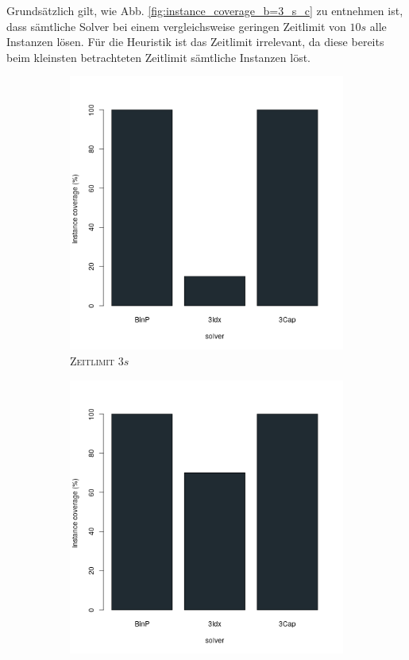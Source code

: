 Grundsätzlich gilt, wie Abb. \ref{fig:instance_coverage_b=3_s_c} zu entnehmen ist, dass sämtliche Solver
bei einem vergleichsweise geringen Zeitlimit von $10s$ alle Instanzen lösen. Für die Heuristik ist das Zeitlimit irrelevant, da
diese bereits beim kleinsten betrachteten Zeitlimit sämtliche Instanzen löst.

\begin{figure}[H]
\centering

\begin{subfigure}[b]{0.3\textwidth}
\centering
\includegraphics[width=1.2\textwidth]{img/solver_instance_coverage_b=3_s_3s.png}
\caption{\textsc{Zeitlimit} $3s$}
\label{fig:instance_coverage_b=3_s_a}
\end{subfigure}
\hfill
\begin{subfigure}[b]{0.3\textwidth}
\centering
\includegraphics[width=1.2\textwidth]{img/solver_instance_coverage_b=3_s_5s.png}

\end{subfigure}
\end{figure}
